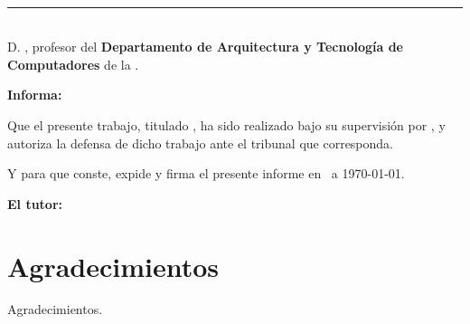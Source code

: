 \newpage
\thispagestyle{empty}
\
\vspace{3cm}

\noindent\rule[-1ex]{\textwidth}{2pt}\\[4.5ex]

D. \textbf{\tutor}, profesor del \textbf{Departamento de Arquitectura y Tecnología de Computadores} de la \textbf{\universidad}.

\vspace{0.5cm}

\vspace{0.5cm}

\textbf{Informa:}

\vspace{0.5cm}

Que el presente trabajo, titulado \textit{\textbf{\titulo}}, ha sido realizado bajo su supervisión por \textbf{\autor}, y 
autoriza la defensa de dicho trabajo ante el tribunal que corresponda.

\vspace{0.5cm}

Y para que conste, expide y firma el presente informe en \ciudad\ a \today.

\vspace{1cm}

\textbf{El tutor:}

\vspace{5cm}

\noindent \textbf{\tutor}

\chapter*{Agradecimientos}
\thispagestyle{empty}

\vspace{1cm}

Agradecimientos.